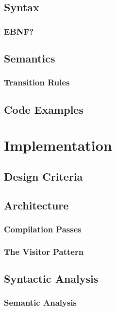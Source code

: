\section{Syntax}
\subsection{EBNF?}
\section{Semantics}
\subsection{Transition Rules}
\section{Code Examples}

\renewcommand{\ind}[1]{}
\chapter{Implementation}
\label{chap:implementation}
\section{Design Criteria}
\section{Architecture}
\ind{Architecture}	
\ind{Hardware}
\ind{OverviewCompiler}
\ind{languageprocessing}
\subsection{Compilation Passes}
\label{sec:CompilationPasses}
\ind{AbstractSyntaxTrees}
\ind{ParseTree}
\subsection{The Visitor Pattern}
\section{Syntactic Analysis}
\subsection{Semantic Analysis}
\ind{KnownLexersAndParsers}
\ind{ANTLR}
\ind{LexicalAnalyzer}
\ind{Tokens}
\ind{Parser}
\ind{ContextualAnalysis}
